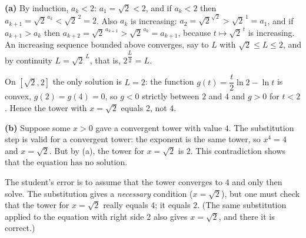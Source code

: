 \textbf{(a)} By induction, $a_k<2$: $a_1=\sqrt2<2$, and if $a_k<2$ then $a_{k+1}=\sqrt2^{\,a_k}<\sqrt2^{\,2}=2$. Also $a_k$ is increasing: $a_2=\sqrt2^{\sqrt2}>\sqrt2^{\,1}=a_1$, and if $a_{k+1}>a_k$ then $a_{k+2}=\sqrt2^{\,a_{k+1}}>\sqrt2^{\,a_k}=a_{k+1}$, because $t\mapsto\sqrt2^{\,t}$ is increasing. An increasing sequence bounded above converges, say to $L$ with $\sqrt2\le L\le2$, and by continuity $L=\sqrt2^{\,L}$, that is, $2^{\dfrac{L}{2}}=L$.

On $[\sqrt2,2]$ the only solution is $L=2$: the function $g(t)=\dfrac{t}{2}\ln2-\ln t$ is convex, $g(2)=g(4)=0$, so $g<0$ strictly between $2$ and $4$ and $g>0$ for $t<2$. Hence the tower with $x=\sqrt2$ equals $\boxed{2}$, not $4$.

\textbf{(b)} Suppose some $x>0$ gave a convergent tower with value $4$. The substitution step is valid for a convergent tower: the exponent is the same tower, so $x^4=4$ and $x=\sqrt2$. But by (a), the tower for $x=\sqrt2$ is $2$. This contradiction shows that $\boxed{\text{the equation has no solution}}$.

The student's error is to assume that the tower converges to $4$ and only then solve. The substitution gives a \emph{necessary} condition ($x=\sqrt2$), but one must check that the tower for $x=\sqrt2$ really equals $4$; it equals $2$. (The same substitution applied to the equation with right side $2$ also gives $x=\sqrt2$, and there it is correct.)
